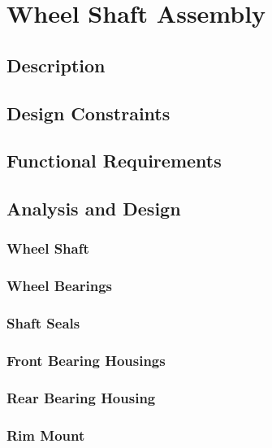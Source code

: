\section{Wheel Shaft Assembly}
\subsection{Description}
\subsection{Design Constraints}
\subsection{Functional Requirements}
\subsection{Analysis and Design}
\subsubsection{Wheel Shaft}
\subsubsection{Wheel Bearings}
\subsubsection{Shaft Seals}
\subsubsection{Front Bearing Housings}
\subsubsection{Rear Bearing Housing}
\subsubsection{Rim Mount}